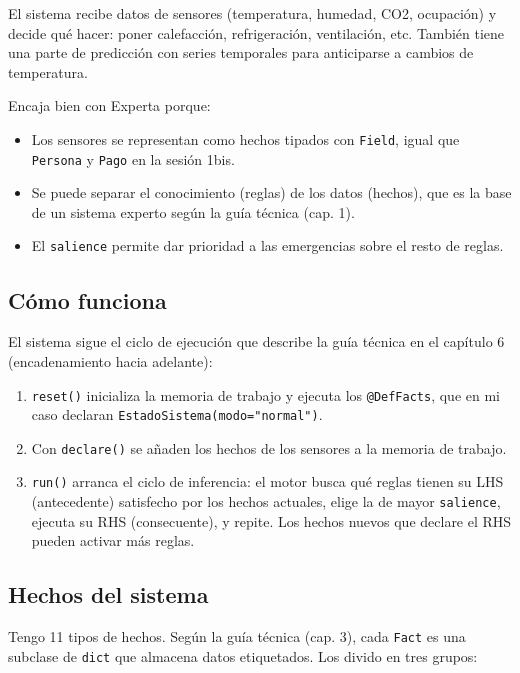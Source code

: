 \documentclass[12pt,a4paper]{article}
\begin{document}
El sistema recibe datos de sensores (temperatura, humedad, CO2, ocupaci\'on) y decide qu\'e hacer: poner calefacci\'on, refrigeraci\'on, ventilaci\'on, etc. Tambi\'en tiene una parte de predicci\'on con series temporales para anticiparse a cambios de temperatura.

Encaja bien con Experta porque:
\begin{itemize}
    \item Los sensores se representan como hechos tipados con \texttt{Field}, igual que \texttt{Persona} y \texttt{Pago} en la sesi\'on 1bis.
    \item Se puede separar el conocimiento (reglas) de los datos (hechos), que es la base de un sistema experto seg\'un la gu\'ia t\'ecnica (cap. 1).
    \item El \texttt{salience} permite dar prioridad a las emergencias sobre el resto de reglas.
\end{itemize}

\subsection{C\'omo funciona}

El sistema sigue el ciclo de ejecuci\'on que describe la gu\'ia t\'ecnica en el cap\'itulo 6 (encadenamiento hacia adelante):

\begin{enumerate}
    \item \texttt{reset()} inicializa la memoria de trabajo y ejecuta los \texttt{@DefFacts}, que en mi caso declaran \texttt{EstadoSistema(modo="normal")}.
    \item Con \texttt{declare()} se a\~naden los hechos de los sensores a la memoria de trabajo.
    \item \texttt{run()} arranca el ciclo de inferencia: el motor busca qu\'e reglas tienen su LHS (antecedente) satisfecho por los hechos actuales, elige la de mayor \texttt{salience}, ejecuta su RHS (consecuente), y repite. Los hechos nuevos que declare el RHS pueden activar m\'as reglas.
\end{enumerate}

\subsection{Hechos del sistema}

Tengo 11 tipos de hechos. Seg\'un la gu\'ia t\'ecnica (cap. 3), cada \texttt{Fact} es una subclase de \texttt{dict} que almacena datos etiquetados. Los divido en tres grupos:
\end{document}
